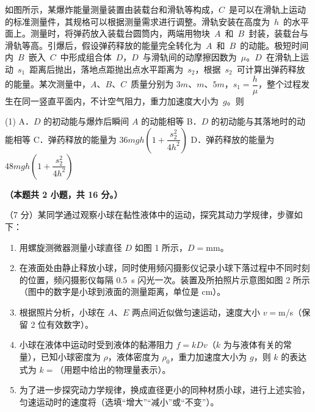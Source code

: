 \begin{question}
如图所示，某爆炸能量测量装置由装载台和滑轨等构成，$C$~是可以在滑轨上运动的标准测量件，其规格可以根据测量需求进行调整。滑轨安装在高度为~$h$~的水平面上。测量时，将弹药放入装载台圆筒内，两端用物块~$A$~和~$B$~封装，装载台与滑轨等高。引爆后，假设弹药释放的能量完全转化为~$A$~和~$B$~的动能。极短时间内~$B$~嵌入~$C$~中形成组合体~$D$，$D$~与滑轨间的动摩擦因数为~$\mu$。$D$~在滑轨上运动~$s_{1}$~距离后抛出，落地点距抛出点水平距离为~$s_{2}$，根据~$s_{2}$~可计算出弹药释放的能量。某次测量中，$A$、$B$、$C$~质量分别为 $3m$、$m$、$5m$，$s_{1}=\dfrac{h}{\mu}$，整个过程发生在同一竖直平面内，不计空气阻力，重力加速度大小为~$g$。则\gkblank


\begin{gkopts}(1)
  \task A．$D$ 的初动能与爆炸后瞬间 $A$ 的动能相等
  \task B．$D$ 的初动能与其落地时的动能相等
  \task C．弹药释放的能量为 $36mgh\left(1+\dfrac{s_{2}^{2}}{4h^{2}}\right)$
  \task D．弹药释放的能量为 $48mgh\left(1+\dfrac{s_{2}^{2}}{4h^{2}}\right)$
\end{gkopts}
\end{question}


\textbf{（本题共 2 小题，共 16 分。）}

\begin{question}
（7 分）某同学通过观察小球在黏性液体中的运动，探究其动力学规律，步骤如下：



\begin{enumerate}[leftmargin=2em, label=(\arabic*)]
  \item 用螺旋测微器测量小球直径 $D$ 如图 1 所示，$D=$\gkblank mm。
  \item 在液面处由静止释放小球，同时使用频闪摄影仪记录小球下落过程中不同时刻的位置，频闪摄影仪每隔 \SI{0.5}{\second} 闪光一次。装置及所拍照片示意图如图 2 所示（图中的数字是小球到液面的测量距离，单位是 cm）。
  \item 根据照片分析，小球在 $A$、$E$ 两点间近似做匀速运动，速度大小 $v=$\gkblank m/s（保留 2 位有效数字）。
  \item 小球在液体中运动时受到液体的黏滞阻力 $f=kDv$（$k$ 为与液体有关的常量），已知小球密度为 $\rho$，液体密度为 $\rho_{0}$，重力加速度大小为 $g$，则 $k$ 的表达式为 $k=$\gkblank（用题中给出的物理量表示）。
  \item 为了进一步探究动力学规律，换成直径更小的同种材质小球，进行上述实验，匀速运动时的速度将\gkblank（选填“增大”“减小”或“不变”）。
\end{enumerate}
\end{question}

